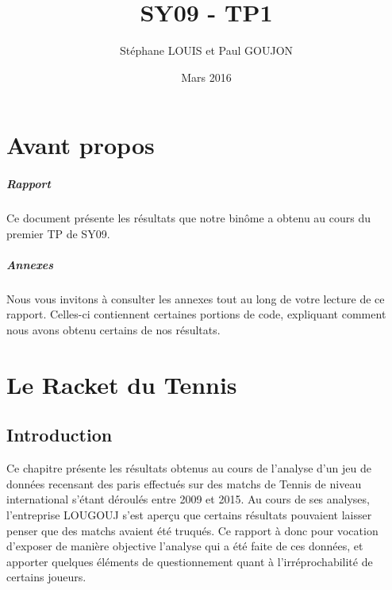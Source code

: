 \documentclass{report}
\begin{document}

\title{SY09 - TP1}
\date{Mars 2016}
\author{Stéphane LOUIS et Paul GOUJON}
\maketitle

\newpage
\tableofcontents{}

\newpage
\chapter{Avant propos}
\paragraph{Rapport}
Ce document présente les résultats que notre binôme a obtenu au cours du premier TP de SY09.

\paragraph{Annexes}
Nous vous invitons à consulter les annexes tout au long de votre lecture de ce rapport. Celles-ci contiennent certaines portions de code, expliquant comment nous avons obtenu certains de nos résultats.

\newpage
{}
\chapter{Le Racket du Tennis}


\section{Introduction}
Ce chapitre présente les résultats obtenus au cours de l'analyse d'un jeu de données recensant des paris effectués sur des matchs de Tennis de niveau international s'étant déroulés entre 2009 et 2015. Au cours de ses analyses, l'entreprise \textregistered LOUGOUJ s'est aperçu que certains résultats pouvaient laisser penser que des matchs avaient été truqués. Ce rapport à donc pour vocation d'exposer de manière objective l'analyse qui a été faite de ces données, et apporter quelques éléments de questionnement quant à l'irréprochabilité de certains joueurs.
\end{document}
